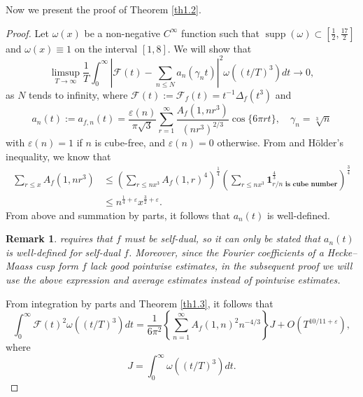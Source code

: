 \documentclass[10pt,leqno]{amsart}
\numberwithin{equation}{section}
\newtheorem{remark}{{Remark}}
\begin{document}
Now we present the proof of Theorem \ref{th1.2}.
\begin{proof}
Let $\omega(x)$ be a non-negative $C^\infty$ function such that $\operatorname{supp}(\omega) \subset \left[\frac{1}{2}, \frac{17}{2}\right]$ and $\omega(x) \equiv 1$ on the interval $[1, 8]$. We will show that
$$
\limsup _{T \rightarrow \infty} \frac{1}{T} \int_0^{\infty}\left|\mathcal{F}(t)-\sum_{n \leqslant N} a_n\left(\gamma_n t\right)\right|^2 \omega\left((t / T)^3\right) d t \rightarrow 0,
$$
as $N$ tends to infinity, where $\mathcal{F}(t):=\mathcal{F}_f(t)=t^{-1}\Delta_f(t^3)$ and
$$
a_n(t):=a_{f,n}(t)=\frac{\varepsilon(n)}{\pi \sqrt{3}} \sum_{r=1}^{\infty} \frac{A_f\left(1,n r^3\right)}{\left(n r^3\right)^{2 / 3}} \cos \{6 \pi r t\}, \quad \gamma_n=\sqrt[3]{n}
$$
with $\varepsilon(n)=1$ if $n$ is cube-free, and $\varepsilon(n)=0$ otherwise. From \cite[Theorem 1.2]{MR3692033} and H\"{o}lder's inequality, we know that
\[
\begin{aligned}
    \sum_{r\leqslant x}A_f(1,nr^3)&\leqslant \left(\sum_{r\leqslant nx^3}A_f(1,r)^4\right)^{\frac{1}{4}}\left(\sum_{r\leqslant nx^3}\textbf{1}_{r/n \textbf{ is cube number} }^{\frac{4}{3}}\right)^\frac{3}{4}\\
    &\leqslant n^{\frac{1}{4}+\varepsilon}x^{\frac{3}{2}+\varepsilon}.
\end{aligned}
\]
From  above and summation by parts, it follows that $a_n(t)$ is well-defined.
\begin{remark}
    \cite[Theorem 1.2]{MR3692033}  requires that $f$ must be self-dual, so it can only be stated that $a_n(t)$ is well-defined for self-dual $f$. Moreover, since the Fourier coefficients of a Hecke–Maass cusp form $f$ lack good pointwise estimates, in the subsequent proof we will use the above expression and average estimates instead of pointwise estimates.
\end{remark}
From  integration by parts and Theorem \ref{th1.3}, it follows that
\begin{equation}\label{eq5.1}
    \int_0^{\infty} \mathcal{F}(t)^2 \omega\left((t / T)^3\right) d t=\frac{1}{6 \pi^2}\left\{\sum_{n=1}^{\infty} A_f(1,n)^2 n^{-4 / 3}\right\} J+O\left(T^{10/11+\varepsilon}\right),
\end{equation}
where
\[
J=\int_0^{\infty} \omega\left((t / T)^3\right) d t.
\]


\end{proof}
\end{document}
